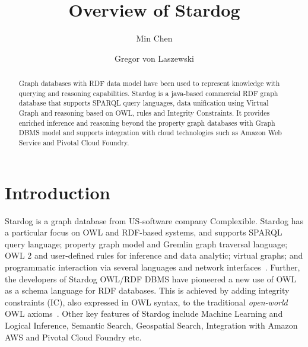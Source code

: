 \title{Overview of Stardog}


\author{Min Chen}

\author{Gregor von Laszewski}

\renewcommand{\shortauthors}{G. v. Laszewski}


\begin{abstract}
Graph databases with RDF data model have been used to represent 
knowledge with querying and reasoning capabilities. Stardog is a java-based 
commercial RDF graph database that supports SPARQL query languages, 
data unification using Virtual Graph and reasoning based on OWL, rules and 
Integrity Constraints. It provides enriched inference and reasoning beyond 
the property graph databases with Graph DBMS model and supports 
integration with cloud technologies such as Amazon Web Service and Pivotal 
Cloud Foundry.

\end{abstract}



\maketitle


\section{Introduction}

Stardog is a graph database from US-software company
Complexible. Stardog has a particular focus on OWL and RDF-based
systems, and supports SPARQL query language; property graph model and 
Gremlin graph traversal language; OWL 2 and user-defined rules for 
inference and data analytic; virtual graphs; and
programmatic interaction via several languages and network
interfaces~\cite{hid-sp18-405-www-stardog-docs}. Further, the
developers of Stardog OWL/RDF DBMS have pioneered a new use of OWL as
a schema language for RDF databases. This is achieved by adding
integrity constraints (IC), also expressed in OWL syntax, to the traditional 
\textit{open-world} OWL 
axioms~\cite{hid-sp18-405-cer2012graphical-stardog}. Other key
features of Stardog include Machine Learning and Logical Inference,
Semantic Search, Geospatial Search, Integration with Amazon AWS and 
Pivotal Cloud Foundry etc.\ 


